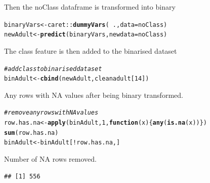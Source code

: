 \documentclass[10pt  ,usenames, dvipsnames]{article}\usepackage[]{graphicx}\usepackage[]{color}
\makeatletter
\newcommand{\hlnum}[1]{\textcolor[rgb]{0.686,0.059,0.569}{#1}}%
\newcommand{\hlcom}[1]{\textcolor[rgb]{0.678,0.584,0.686}{\textit{#1}}}%
\newcommand{\hlopt}[1]{\textcolor[rgb]{0,0,0}{#1}}%
\newcommand{\hlstd}[1]{\textcolor[rgb]{0.345,0.345,0.345}{#1}}%
\newcommand{\hlkwa}[1]{\textcolor[rgb]{0.161,0.373,0.58}{\textbf{#1}}}%
\newcommand{\hlkwb}[1]{\textcolor[rgb]{0.69,0.353,0.396}{#1}}%
\newcommand{\hlkwc}[1]{\textcolor[rgb]{0.333,0.667,0.333}{#1}}%
\newcommand{\hlkwd}[1]{\textcolor[rgb]{0.737,0.353,0.396}{\textbf{#1}}}%
\newenvironment{kframe}{%
 \def\at@end@of@kframe{}%
 \ifinner\ifhmode%
  \def\at@end@of@kframe{\end{minipage}}%
  \begin{minipage}{\columnwidth}%
 \fi\fi%
 \def\FrameCommand##1{\hskip\@totalleftmargin \hskip-\fboxsep
 \colorbox{shadecolor}{##1}\hskip-\fboxsep
     \hskip-\linewidth \hskip-\@totalleftmargin \hskip\columnwidth}%
 \MakeFramed {\advance\hsize-\width
   \@totalleftmargin\z@ \linewidth\hsize
   \@setminipage}}%
 {\par\unskip\endMakeFramed%
 \at@end@of@kframe}
\newenvironment{knitrout}{}{} %
\makeatother
\begin{document}
Then the noClass dataframe is transformed into binary

\begin{knitrout}
\color{fgcolor}\begin{kframe}
\begin{alltt}
\hlstd{binaryVars} \hlkwb{<-} \hlstd{caret}\hlopt{::}\hlkwd{dummyVars}\hlstd{(}\hlopt{~} \hlstd{.,} \hlkwc{data} \hlstd{= noClass)}
\hlstd{newAdult} \hlkwb{<-} \hlkwd{predict}\hlstd{(binaryVars,} \hlkwc{newdata} \hlstd{= noClass)}
\end{alltt}
\end{kframe}
\end{knitrout}



The class feature is then added to the binarised dataset
\begin{knitrout}
\color{fgcolor}\begin{kframe}
\begin{alltt}
\hlcom{#add class to binarised dataset}
\hlstd{binAdult} \hlkwb{<-}\hlkwd{cbind}\hlstd{(newAdult, cleanadult[}\hlnum{14}\hlstd{])}
\end{alltt}
\end{kframe}
\end{knitrout}



Any rows with NA values after being binary transformed.
\begin{knitrout}
\color{fgcolor}\begin{kframe}
\begin{alltt}
\hlcom{#remove any rows with NA values}
\hlstd{row.has.na} \hlkwb{<-} \hlkwd{apply}\hlstd{(binAdult,} \hlnum{1}\hlstd{,} \hlkwa{function}\hlstd{(}\hlkwc{x}\hlstd{)\{}\hlkwd{any}\hlstd{(}\hlkwd{is.na}\hlstd{(x))\})}
\hlkwd{sum}\hlstd{(row.has.na)}
\hlstd{binAdult} \hlkwb{<-} \hlstd{binAdult[}\hlopt{!}\hlstd{row.has.na,]}
\end{alltt}
\end{kframe}
\end{knitrout}

Number of NA rows removed.
\begin{knitrout}
\color{fgcolor}\begin{kframe}
\begin{verbatim}
## [1] 556
\end{verbatim}
\end{kframe}
\end{knitrout}
\end{document}
